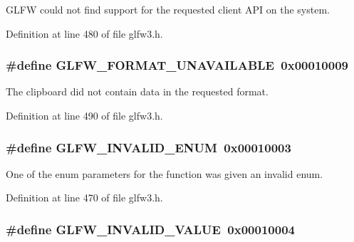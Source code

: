 G\-L\-F\-W could not find support for the requested client A\-P\-I on the system. 



Definition at line 480 of file glfw3.\-h.

\hypertarget{group__errors_ga196e125ef261d94184e2b55c05762f14}{
\subsubsection[{G\-L\-F\-W\-\_\-\-F\-O\-R\-M\-A\-T\-\_\-\-U\-N\-A\-V\-A\-I\-L\-A\-B\-L\-E}]{\setlength{\rightskip}{0pt plus 5cm}\#define G\-L\-F\-W\-\_\-\-F\-O\-R\-M\-A\-T\-\_\-\-U\-N\-A\-V\-A\-I\-L\-A\-B\-L\-E~0x00010009}}\label{group__errors_ga196e125ef261d94184e2b55c05762f14}


The clipboard did not contain data in the requested format. 



Definition at line 490 of file glfw3.\-h.

\hypertarget{group__errors_ga76f6bb9c4eea73db675f096b404593ce}{
\subsubsection[{G\-L\-F\-W\-\_\-\-I\-N\-V\-A\-L\-I\-D\-\_\-\-E\-N\-U\-M}]{\setlength{\rightskip}{0pt plus 5cm}\#define G\-L\-F\-W\-\_\-\-I\-N\-V\-A\-L\-I\-D\-\_\-\-E\-N\-U\-M~0x00010003}}\label{group__errors_ga76f6bb9c4eea73db675f096b404593ce}


One of the enum parameters for the function was given an invalid enum. 



Definition at line 470 of file glfw3.\-h.

\hypertarget{group__errors_gaaf2ef9aa8202c2b82ac2d921e554c687}{
\subsubsection[{G\-L\-F\-W\-\_\-\-I\-N\-V\-A\-L\-I\-D\-\_\-\-V\-A\-L\-U\-E}]{\setlength{\rightskip}{0pt plus 5cm}\#define G\-L\-F\-W\-\_\-\-I\-N\-V\-A\-L\-I\-D\-\_\-\-V\-A\-L\-U\-E~0x00010004}}\label{group__errors_gaaf2ef9aa8202c2b82ac2d921e554c687}


